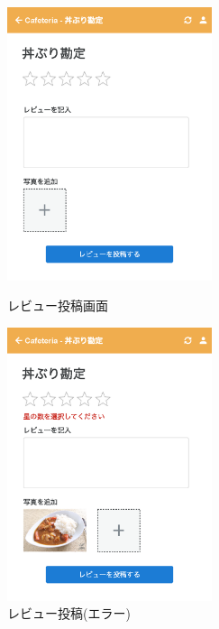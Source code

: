 \documentclass[a4paper]{ltjsarticle}
\begin{document}
        \begin{figure}[ht]
            \begin{minipage}[t]{.49\textwidth}
                \center
                \includegraphics[width=60mm]{ui/new-review.png}
                \caption{レビュー投稿画面}
                \label{img:new-review}
            \end{minipage}
            \begin{minipage}[t]{.49\textwidth}
                \center
                \includegraphics[width=60mm]{ui/new-review-error.png}
                \caption{レビュー投稿(エラー) }
                \label{img:new-review-error}
            \end{minipage}
        \end{figure}
\end{document}

